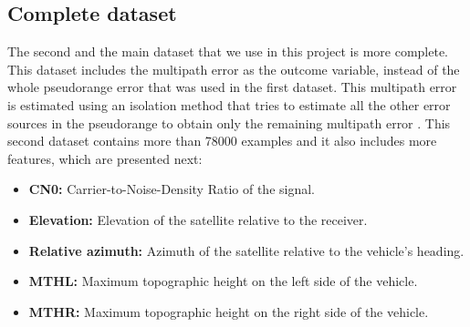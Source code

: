 \documentclass[a4paper, report, oneside, UKenglish]{memoir}
\begin{document}
\subsection{Complete dataset}
The second and the main dataset that we use in this project is more complete. This dataset includes the multipath error as the outcome variable, instead of the whole pseudorange error that was used in the first dataset. This multipath error is estimated using an isolation method that tries to estimate all the other error sources in the pseudorange to obtain only the remaining multipath error \cite{matera_chatacterization_2019}. This second dataset contains more than 78000 examples and it also includes more features, which are presented next:

\begin{itemize}
    \item \textbf{CN0:} Carrier-to-Noise-Density Ratio of the signal.
    \item \textbf{Elevation:} Elevation of the satellite relative to the receiver.
    \item \textbf{Relative azimuth:} Azimuth of the satellite relative to the vehicle's heading.
    \item \textbf{MTHL:} Maximum topographic height on the left side of the vehicle.
    \item \textbf{MTHR:} Maximum topographic height on the right side of the vehicle.
\end{itemize}
\end{document}
